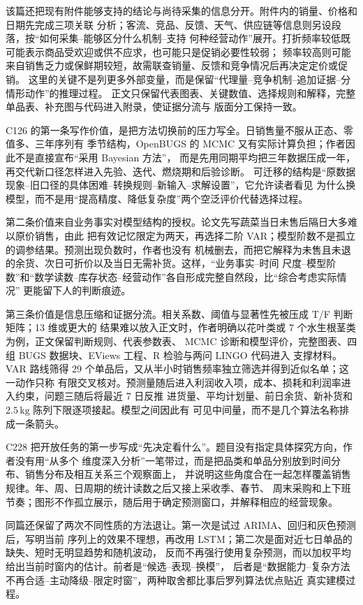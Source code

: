 \documentclass[UTF8,a4paper,12pt]{ctexart}
\begin{document}
该篇还把现有附件能够支持的结论与尚待采集的信息分开。附件内的销量、价格和日期先完成三项关联
分析；客流、竞品、反馈、天气、供应链等信息则另设段落，按“如何采集--能够区分什么机制--支持
何种经营动作”展开。打折频率较低既可能表示商品受欢迎或供不应求，也可能只是促销必要性较弱；
频率较高则可能来自销售乏力或保鲜期较短，故需联查销量、反馈和竞争情况后再决定定价或促销。
这里的关键不是列更多外部变量，而是保留“代理量--竞争机制--追加证据--分情形动作”的推理过程。
正文只保留代表图表、关键数值、选择规则和解释，完整单品表、补充图与代码进入附录，使证据分流与
版面分工保持一致。

C126 的第一条写作价值，是把方法切换前的压力写全。日销售量不服从正态、零值多、三年序列有
季节结构，OpenBUGS 的 MCMC 又有实际计算负担；作者因此不是直接宣布“采用 Bayesian 方法”，
而是先用同期平均把三年数据压成一年，再交代新口径怎样进入先验、迭代、燃烧期和后验诊断。
可迁移的结构是“原数据现象--旧口径的具体困难--转换规则--新输入--求解设置”，它允许读者看见
为什么换模型，而不是用“提高精度、降低复杂度”两个空泛评价代替选择过程。

第二条价值来自业务事实对模型结构的授权。论文先写蔬菜当日未售后隔日大多难以原价销售，由此
把有效记忆限定为两天，再选择二阶 VAR；模型阶数不是孤立的调参结果。预测出现负数时，作者也没有
机械删去，而把它解释为未售且未退的余货、次日可折价以及当日无需补货。这样，“业务事实--时间
尺度--模型阶数”和“数学读数--库存状态--经营动作”各自形成完整自然段，比“综合考虑实际情况”
更能留下人的判断痕迹。

第三条价值是信息压缩和证据分流。相关系数、阈值与显著性先被压成 T/F 判断矩阵；13 维或更大的
结果难以放入正文时，作者明确以花叶类或 7 个水生根茎类为例，正文保留判断规则、代表参数表、
MCMC 诊断和模型评价，完整图表、四组 BUGS 数据块、EViews 工程、R 检验与两问 LINGO 代码进入
支撑材料。VAR 路线筛得 29 个单品后，又从半小时销售频率独立筛选并得到近似名单；这一动作只称
有限交叉核对。预测量随后进入利润收入项，成本、损耗和利润率进入约束，问题三随后将最近 7 日反推
进货量、平均计划量、前日余货、新补货和 $2.5\,\mathrm{kg}$ 陈列下限逐项接起。模型之间因此有
可见中间量，而不是几个算法名称排成一条箭头。

C228 把开放任务的第一步写成“先决定看什么”。题目没有指定具体探究方向，作者没有用“从多个
维度深入分析”一笔带过，而是把品类和单品分别放到时间分布、销售分布及相互关系三个观察面上，
并说明这些角度合在一起怎样覆盖销售规律。年、周、日周期的统计读数之后又接上采收季、春节、
周末采购和上下班节奏；图形不作孤立展示，随后用于确定预测窗口，并解释相应的经营现象。

同篇还保留了两次不同性质的方法退让。第一次是试过 ARIMA、回归和灰色预测后，写明当前
序列上的效果不理想，再改用 LSTM；第二次是面对近七日单品的缺失、短时无明显趋势和随机波动，
反而不再强行使用复杂预测，而以加权平均给出当前时窗内的估计。前者是“候选--表现--换模”，
后者是“数据能力--复杂方法不再合适--主动降级--限定时窗”，两种取舍都比事后罗列算法优点贴近
真实建模过程。
\end{document}
